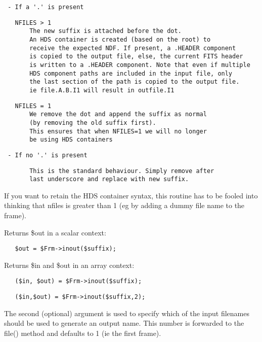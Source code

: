 \begin{description}
\begin{description}
\begin{verbatim}
 - If a '.' is present
\end{verbatim}
\begin{verbatim}
   NFILES > 1
       The new suffix is attached before the dot.
       An HDS container is created (based on the root) to
       receive the expected NDF. If present, a .HEADER component
       is copied to the output file, else, the current FITS header
       is written to a .HEADER component. Note that even if multiple
       HDS component paths are included in the input file, only
       the last section of the path is copied to the output file.
       ie file.A.B.I1 will result in outfile.I1
\end{verbatim}
\begin{verbatim}
   NFILES = 1
       We remove the dot and append the suffix as normal
       (by removing the old suffix first).
       This ensures that when NFILES=1 we will no longer
       be using HDS containers
\end{verbatim}
\begin{verbatim}
 - If no '.' is present
\end{verbatim}
\begin{verbatim}
       This is the standard behaviour. Simply remove after
       last underscore and replace with new suffix.
\end{verbatim}


If you want to retain the HDS container syntax, this routine has to be
fooled into thinking that nfiles is greater than 1 (eg by adding a dummy
file name to the frame).



Returns \$out in a scalar context:

\begin{verbatim}
   $out = $Frm->inout($suffix);
\end{verbatim}


Returns \$in and \$out in an array context:

\begin{verbatim}
   ($in, $out) = $Frm->inout($suffix);
\end{verbatim}
\begin{verbatim}
   ($in,$out) = $Frm->inout($suffix,2);
\end{verbatim}


The second (optional) argument is used to specify which of the input
filenames should be used to generate an output name. This number is
forwarded to the file() method and defaults to 1 (ie the first frame).




\end{description}
\end{description}
